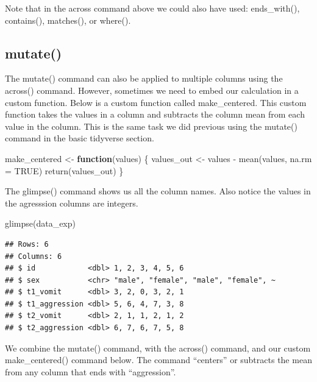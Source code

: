 \documentclass[
]{krantz}
\makeatletter
\newenvironment{Shaded}{\begin{snugshade}}{\end{snugshade}}
\newcommand{\AttributeTok}[1]{\textcolor[rgb]{0.61,0.61,0.61}{#1}}
\newcommand{\ConstantTok}[1]{\textcolor[rgb]{0,0,0}{#1}}
\newcommand{\ControlFlowTok}[1]{\textcolor[rgb]{0.27,0.27,0.27}{\textbf{#1}}}
\newcommand{\FunctionTok}[1]{\textcolor[rgb]{0,0,0}{#1}}
\newcommand{\NormalTok}[1]{#1}
\newcommand{\OtherTok}[1]{\textcolor[rgb]{0.37,0.37,0.37}{#1}}
\newcommand{\SpecialCharTok}[1]{\textcolor[rgb]{0,0,0}{#1}}
\newenvironment{kframe}{%
\medskip{}
\setlength{\fboxsep}{.8em}
 \def\at@end@of@kframe{}%
 \ifinner\ifhmode%
  \def\at@end@of@kframe{\end{minipage}}%
  \begin{minipage}{\columnwidth}%
 \fi\fi%
 \def\FrameCommand##1{\hskip\@totalleftmargin \hskip-\fboxsep
 \colorbox{shadecolor}{##1}\hskip-\fboxsep
     \hskip-\linewidth \hskip-\@totalleftmargin \hskip\columnwidth}%
 \MakeFramed {\advance\hsize-\width
   \@totalleftmargin\z@ \linewidth\hsize
   \@setminipage}}%
 {\par\unskip\endMakeFramed%
 \at@end@of@kframe}
\renewenvironment{Shaded}{\begin{kframe}}{\end{kframe}}
\makeatother
\begin{document}
Note that in the across command above we could also have used: ends\_with(), contains(), matches(), or where().

\hypertarget{mutate-1}{%
\subsection{mutate()}\label{mutate-1}}

The mutate() command can also be applied to multiple columns using the across() command. However, sometimes we need to embed our calculation in a custom function. Below is a custom function called make\_centered. This custom function takes the values in a column and subtracts the column mean from each value in the column. This is the same task we did previous using the mutate() command in the basic tidyverse section.

\begin{Shaded}
\begin{Highlighting}[]
\NormalTok{make\_centered }\OtherTok{\textless{}{-}} \ControlFlowTok{function}\NormalTok{(values) \{}
\NormalTok{  values\_out }\OtherTok{\textless{}{-}}\NormalTok{ values }\SpecialCharTok{{-}} \FunctionTok{mean}\NormalTok{(values, }\AttributeTok{na.rm =} \ConstantTok{TRUE}\NormalTok{)}
  \FunctionTok{return}\NormalTok{(values\_out)}
\NormalTok{\}}
\end{Highlighting}
\end{Shaded}

The glimpse() command shows us all the column names. Also notice the values in the agresssion columns are integers.

\begin{Shaded}
\begin{Highlighting}[]
\FunctionTok{glimpse}\NormalTok{(data\_exp)}
\end{Highlighting}
\end{Shaded}

\begin{verbatim}
## Rows: 6
## Columns: 6
## $ id            <dbl> 1, 2, 3, 4, 5, 6
## $ sex           <chr> "male", "female", "male", "female", ~
## $ t1_vomit      <dbl> 3, 2, 0, 3, 2, 1
## $ t1_aggression <dbl> 5, 6, 4, 7, 3, 8
## $ t2_vomit      <dbl> 2, 1, 1, 2, 1, 2
## $ t2_aggression <dbl> 6, 7, 6, 7, 5, 8
\end{verbatim}

We combine the mutate() command, with the across() command, and our custom make\_centered() command below. The command ``centers'' or subtracts the mean from any column that ends with ``aggression''.
\end{document}
